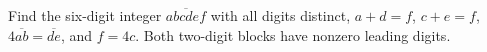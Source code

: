 Find the six-digit integer $\overline{abcdef}$ with all digits distinct, $a+d=f$, $c+e=f$, $4\overline{ab}=\overline{de}$, and $f=4c$. Both two-digit blocks have nonzero leading digits.
